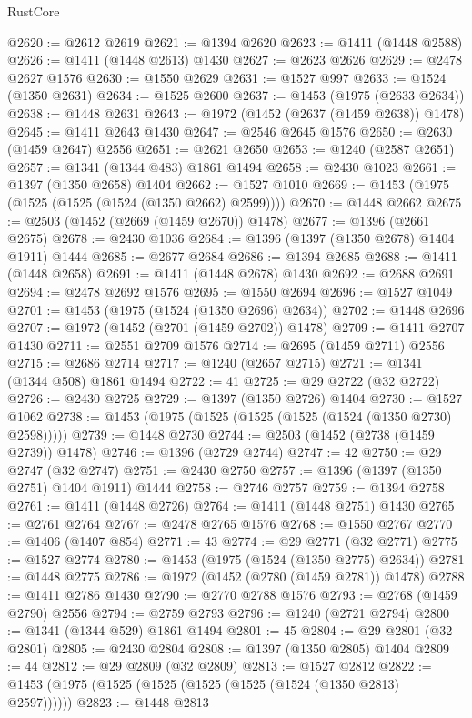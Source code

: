\begin{lexlean}{RustCore}
\begin{coremodule}
@2620 := @2612 @2619
@2621 := @1394 @2620
@2623 := @1411 (@1448 @2588)
@2626 := @1411 (@1448 @2613) @1430
@2627 := @2623 @2626
@2629 := @2478 @2627 @1576
@2630 := @1550 @2629
@2631 := @1527 @997
@2633 := @1524 (@1350 @2631)
@2634 := @1525 @2600
@2637 := @1453 (@1975 (@2633 @2634))
@2638 := @1448 @2631
@2643 := @1972 (@1452 (@2637 (@1459 @2638)) @1478)
@2645 := @1411 @2643 @1430
@2647 := @2546 @2645 @1576
@2650 := @2630 (@1459 @2647) @2556
@2651 := @2621 @2650
@2653 := @1240 (@2587 @2651)
@2657 := @1341 (@1344 @483) @1861 @1494
@2658 := @2430 @1023
@2661 := @1397 (@1350 @2658) @1404
@2662 := @1527 @1010
@2669 := @1453 (@1975 (@1525 (@1525 (@1524 (@1350 @2662) @2599))))
@2670 := @1448 @2662
@2675 := @2503 (@1452 (@2669 (@1459 @2670)) @1478)
@2677 := @1396 (@2661 @2675)
@2678 := @2430 @1036
@2684 := @1396 (@1397 (@1350 @2678) @1404 @1911) @1444
@2685 := @2677 @2684
@2686 := @1394 @2685
@2688 := @1411 (@1448 @2658)
@2691 := @1411 (@1448 @2678) @1430
@2692 := @2688 @2691
@2694 := @2478 @2692 @1576
@2695 := @1550 @2694
@2696 := @1527 @1049
@2701 := @1453 (@1975 (@1524 (@1350 @2696) @2634))
@2702 := @1448 @2696
@2707 := @1972 (@1452 (@2701 (@1459 @2702)) @1478)
@2709 := @1411 @2707 @1430
@2711 := @2551 @2709 @1576
@2714 := @2695 (@1459 @2711) @2556
@2715 := @2686 @2714
@2717 := @1240 (@2657 @2715)
@2721 := @1341 (@1344 @508) @1861 @1494
@2722 := 41
@2725 := @29 @2722 (@32 @2722)
@2726 := @2430 @2725
@2729 := @1397 (@1350 @2726) @1404
@2730 := @1527 @1062
@2738 := @1453 (@1975 (@1525 (@1525 (@1525 (@1524 (@1350 @2730) @2598)))))
@2739 := @1448 @2730
@2744 := @2503 (@1452 (@2738 (@1459 @2739)) @1478)
@2746 := @1396 (@2729 @2744)
@2747 := 42
@2750 := @29 @2747 (@32 @2747)
@2751 := @2430 @2750
@2757 := @1396 (@1397 (@1350 @2751) @1404 @1911) @1444
@2758 := @2746 @2757
@2759 := @1394 @2758
@2761 := @1411 (@1448 @2726)
@2764 := @1411 (@1448 @2751) @1430
@2765 := @2761 @2764
@2767 := @2478 @2765 @1576
@2768 := @1550 @2767
@2770 := @1406 (@1407 @854)
@2771 := 43
@2774 := @29 @2771 (@32 @2771)
@2775 := @1527 @2774
@2780 := @1453 (@1975 (@1524 (@1350 @2775) @2634))
@2781 := @1448 @2775
@2786 := @1972 (@1452 (@2780 (@1459 @2781)) @1478)
@2788 := @1411 @2786 @1430
@2790 := @2770 @2788 @1576
@2793 := @2768 (@1459 @2790) @2556
@2794 := @2759 @2793
@2796 := @1240 (@2721 @2794)
@2800 := @1341 (@1344 @529) @1861 @1494
@2801 := 45
@2804 := @29 @2801 (@32 @2801)
@2805 := @2430 @2804
@2808 := @1397 (@1350 @2805) @1404
@2809 := 44
@2812 := @29 @2809 (@32 @2809)
@2813 := @1527 @2812
@2822 := @1453 (@1975 (@1525 (@1525 (@1525 (@1525 (@1524 (@1350 @2813) @2597))))))
@2823 := @1448 @2813

\end{coremodule}
\end{lexlean}
